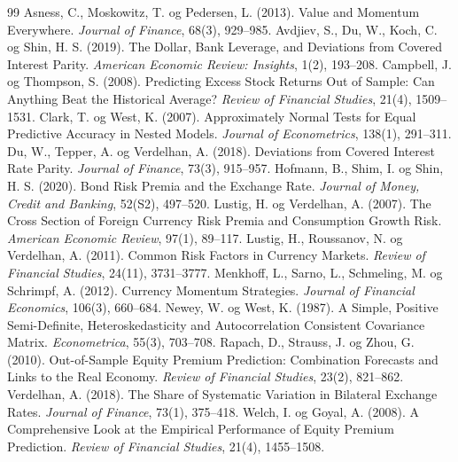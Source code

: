 \documentclass[11pt,a4paper]{article}
\begin{document}
\begin{thebibliography}{99}\small
\setlength{\itemsep}{0.15em}
 Asness, C., Moskowitz, T. og Pedersen, L. (2013). Value and Momentum Everywhere. \emph{Journal of Finance}, 68(3), 929--985.
 Avdjiev, S., Du, W., Koch, C. og Shin, H. S. (2019). The Dollar, Bank Leverage, and Deviations from Covered Interest Parity. \emph{American Economic Review: Insights}, 1(2), 193--208.
 Campbell, J. og Thompson, S. (2008). Predicting Excess Stock Returns Out of Sample: Can Anything Beat the Historical Average? \emph{Review of Financial Studies}, 21(4), 1509--1531.
 Clark, T. og West, K. (2007). Approximately Normal Tests for Equal Predictive Accuracy in Nested Models. \emph{Journal of Econometrics}, 138(1), 291--311.
 Du, W., Tepper, A. og Verdelhan, A. (2018). Deviations from Covered Interest Rate Parity. \emph{Journal of Finance}, 73(3), 915--957.
 Hofmann, B., Shim, I. og Shin, H. S. (2020). Bond Risk Premia and the Exchange Rate. \emph{Journal of Money, Credit and Banking}, 52(S2), 497--520.
 Lustig, H. og Verdelhan, A. (2007). The Cross Section of Foreign Currency Risk Premia and Consumption Growth Risk. \emph{American Economic Review}, 97(1), 89--117.
 Lustig, H., Roussanov, N. og Verdelhan, A. (2011). Common Risk Factors in Currency Markets. \emph{Review of Financial Studies}, 24(11), 3731--3777.
 Menkhoff, L., Sarno, L., Schmeling, M. og Schrimpf, A. (2012). Currency Momentum Strategies. \emph{Journal of Financial Economics}, 106(3), 660--684.
 Newey, W. og West, K. (1987). A Simple, Positive Semi-Definite, Heteroskedasticity and Autocorrelation Consistent Covariance Matrix. \emph{Econometrica}, 55(3), 703--708.
 Rapach, D., Strauss, J. og Zhou, G. (2010). Out-of-Sample Equity Premium Prediction: Combination Forecasts and Links to the Real Economy. \emph{Review of Financial Studies}, 23(2), 821--862.
 Verdelhan, A. (2018). The Share of Systematic Variation in Bilateral Exchange Rates. \emph{Journal of Finance}, 73(1), 375--418.
 Welch, I. og Goyal, A. (2008). A Comprehensive Look at the Empirical Performance of Equity Premium Prediction. \emph{Review of Financial Studies}, 21(4), 1455--1508.
\end{thebibliography}
\end{document}
